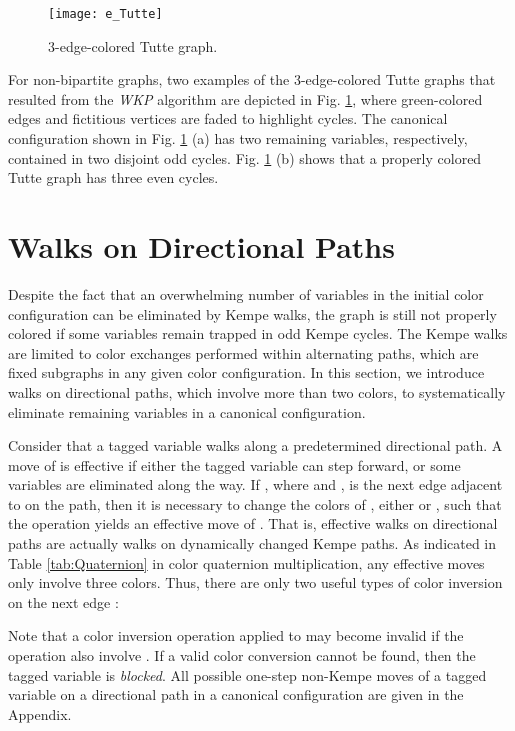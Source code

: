 \documentclass[11pt]{article}
\begin{document}
\begin{figure}[htpb]
	\centering
	\texttt{[image: e\_Tutte]}
	\caption{3-edge-colored Tutte graph.}
	\label{fig:Tutte}
\end{figure}

For non-bipartite graphs, two examples of the 3-edge-colored Tutte graphs that resulted from the {\it WKP} algorithm are depicted in Fig. \ref{fig:Tutte}, where green-colored edges and fictitious vertices are faded to highlight  cycles. The canonical configuration shown in Fig. \ref{fig:Tutte} (a) has two remaining  variables, respectively, contained in two disjoint odd  cycles. Fig. \ref{fig:Tutte} (b) shows that a properly colored Tutte graph has three even  cycles. 


\section{Walks on Directional Paths}

Despite the fact that an overwhelming number of variables in the initial color configuration can be eliminated by Kempe walks, the graph  is still not properly colored if some variables remain trapped in odd Kempe cycles. The Kempe walks are limited to color exchanges performed within alternating paths, which are fixed subgraphs  in any given color configuration. In this section, we introduce walks on directional paths, which involve more than two colors, to systematically eliminate remaining variables in a canonical configuration.  

Consider that a tagged variable   walks along a predetermined directional path. A move of    is effective if either the tagged variable can step forward, or some variables are eliminated along the way. If , where  and , is the next edge adjacent to  on the path, then it is necessary to change the colors of , either  or , such that the operation  yields an effective move of . That is, effective walks on directional paths are actually walks on dynamically changed Kempe paths. As indicated in Table \ref{tab:Quaternion} in color quaternion multiplication, any effective moves only involve three colors. Thus, there are only two useful types of color inversion on the next edge : 

Note that a color inversion operation applied to  may become invalid if the operation also involve . If a valid color conversion cannot be found, then the tagged variable  is {\it blocked}. All possible one-step non-Kempe moves of a tagged variable on a directional path in a canonical configuration are given in the Appendix.
\end{document}
